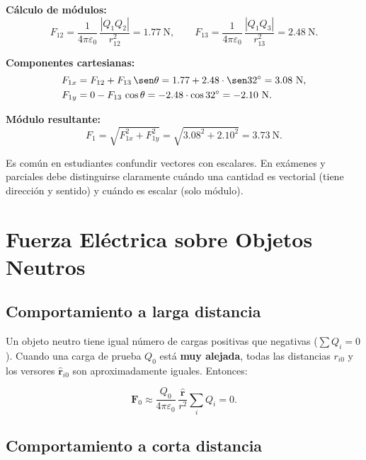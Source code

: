 \documentclass[12pt,a4paper]{article}
\begin{document}
\textbf{Cálculo de módulos:}
\[
F_{12} = \frac{1}{4\pi\varepsilon_0}\,\frac{|Q_1 Q_2|}{r_{12}^2} = 1.77\ \text{N},
\qquad
F_{13} = \frac{1}{4\pi\varepsilon_0}\,\frac{|Q_1 Q_3|}{r_{13}^2} = 2.48\ \text{N}.
\]

\textbf{Componentes cartesianas:}
\begin{align*}
F_{1x} &= F_{12} + F_{13}\,\sen\theta = 1.77 + 2.48\cdot\sen32^\circ = 3.08\ \text{N}, \\
F_{1y} &= 0 - F_{13}\,\cos\theta = -2.48\cdot\cos32^\circ = -2.10\ \text{N}.
\end{align*}

\textbf{Módulo resultante:}
\[
F_1 = \sqrt{F_{1x}^2 + F_{1y}^2} = \sqrt{3.08^2 + 2.10^2} = 3.73\ \text{N}.
\]



\begin{notebox}
Es común en estudiantes confundir vectores con escalares. En exámenes y parciales debe distinguirse claramente cuándo una cantidad es vectorial (tiene dirección y sentido) y cuándo es escalar (solo módulo).
\end{notebox}

\section{Fuerza Eléctrica sobre Objetos Neutros}

\subsection{Comportamiento a larga distancia}

Un objeto neutro tiene igual número de cargas positivas que negativas ($\sum Q_i = 0$). Cuando una carga de prueba $Q_0$ está \textbf{muy alejada}, todas las distancias $r_{i0}$ y los versores $\hat{\mathbf{r}}_{i0}$ son aproximadamente iguales. Entonces:

\[
\mathbf{F}_0 \approx \frac{Q_0}{4\pi\varepsilon_0}\,\frac{\hat{\mathbf{r}}}{r^2} \sum_i Q_i = 0.
\]

\subsection{Comportamiento a corta distancia}
\end{document}
